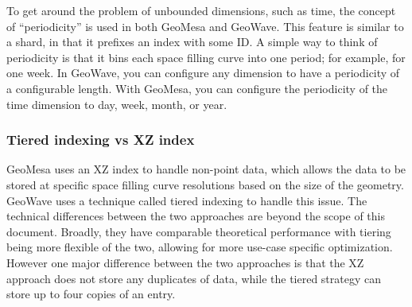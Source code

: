 To get around the problem of unbounded dimensions, such as time, the concept of ``periodicity'' is used in both GeoMesa and GeoWave.
This feature is similar to a shard, in that it prefixes an index with some ID.
A simple way to think of periodicity is that it bins each space filling curve into one period; for example, for one week.
In GeoWave, you can configure any dimension to have a periodicity of a configurable length.
With GeoMesa, you can configure the periodicity of the time dimension to day, week, month, or year.

\subsubsection{Tiered indexing vs XZ index}
\label{sec:featurecompare:indexing:versus}

GeoMesa uses an XZ index to handle non-point data, which allows the data to be stored at specific space filling curve resolutions based on the size of the geometry.
GeoWave uses a technique called tiered indexing to handle this issue.
The technical differences between the two approaches are beyond the scope of this document.
Broadly, they have comparable theoretical performance with tiering being more flexible of the two, allowing for more use-case specific optimization.
However one major difference between the two approaches is that the XZ approach does not store any duplicates of data, while the tiered strategy can store up to four copies of an entry.
